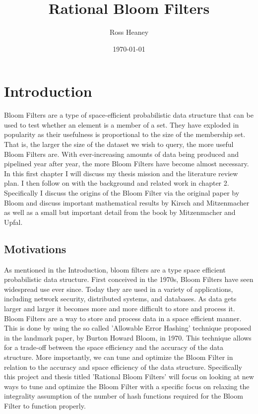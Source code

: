 \documentclass[MScCS]{uccthesis}
\title{Rational Bloom Filters}
\author{Ross Heaney}
\date{\today}
\begin{document}
\chapter{Introduction}

Bloom Filters are a type of space-efficient probabilistic data structure that can be used to test whether an element is a member of a set. They have exploded in popularity as their usefulness is proportional to the size of the membership set. That is, the larger the size of the dataset we wish to query, the more useful Bloom Filters are. With ever-increasing amounts of data being produced and pipelined year after year, the more Bloom Filters have become almost necessary. In this first chapter I will discuss my thesis mission and the literature review plan. I then follow on with the background and related work in chapter 2. Specifically I discuss the origins of the Bloom Filter via the original paper by Bloom\cite{bloom1970space} and discuss important mathematical results by Kirsch and Mitzenmacher as well as a small but important detail from the book by Mitzenmacher and Upfal\cite{kirsch2006less}\cite{mitzenmacher2017probability}.

\section{Motivations}
As mentioned in the Introduction, bloom filters are a type space efficient probabilistic data structure. First conceived in the 1970s, Bloom Filters have seen widespread use ever since. Today they are used in a variety of applications, including network security, distributed systems, and databases. As data gets larger and larger it becomes more and more difficult to store and process it. Bloom Filters are a way to store and process data in a space efficient manner. This is done by using the so called 'Allowable Error Hashing' technique proposed in the landmark paper, by Burton Howard Bloom, in 1970\cite{bloom1970space}. This technique allows for a trade-off between the space efficiency and the accuracy of the data structure. More importantly, we can tune and optimize the Bloom Filter in relation to the accuracy and space efficiency of the data structure. Specifically this project and thesis titled 'Rational Bloom Filters' will focus on looking at new ways to tune and optimize the Bloom Filter with a specific focus on relaxing the integrality assumption of the number of hash functions required for the Bloom Filter to function properly.
\end{document}
